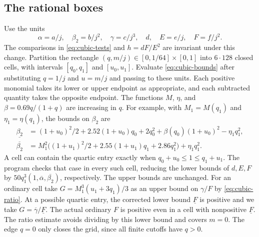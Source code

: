 \subsection{The rational boxes}

Use the units
\[
 \alpha=a/j,\quad \beta_2=b/j^2,\quad \gamma=c/j^3,\quad
 d,\quad E=e/j,\quad F=f/j^2 .
\]
The comparisons in \eqref{eq:cubic-tests} and \(h=dF/E^2\) are invariant
under this change. Partition the rectangle
\((q,m/j)\in[0,1/64]\times[0,1]\) into \(6\cdot128\) closed cells, with
intervals \([q_0,q_1]\) and \([u_0,u_1]\).
Evaluate \eqref{eq:cubic-bounds} after substituting \(q=1/j\) and
\(u=m/j\) and passing to these units. Each positive monomial takes its
lower or upper endpoint as appropriate, and each subtracted quantity
takes the opposite endpoint. The functions \(M\), \(\eta\), and
\(\beta=0.69q/(1+q)\) are increasing in \(q\).
For example, with \(M_1=M(q_1)\) and \(\eta_1=\eta(q_1)\), the bounds
on \(\beta_2\) are
\[
\begin{aligned}
\underline{\beta_2}
 &= (1+u_0)^2/2+2.52(1+u_0)q_0+2q_0^2
           +\beta(q_0)(1+u_0)^2-\eta_1q_1^2,\\
\overline{\beta_2}
 &= M_1^2\bigl((1+u_1)^2/2+2.55(1+u_1)q_1+2.86q_1^2\bigr)
           +\eta_1q_1^2 .
\end{aligned}
\]
A cell can contain the quartic entry exactly when
\(q_0+u_0\le1\le q_1+u_1\). The program checks that case in every such
cell, reducing the lower bounds of \(d,E,F\) by
\(50q_1^3(1,\overline{\alpha},\overline{\beta_2})\), respectively.
The upper bounds are unchanged. For an ordinary cell take
\(G=M_1^3(u_1+3q_1)/3\) as an upper bound on \(\gamma/F\) by
\eqref{eq:cubic-ratio}. At a possible quartic entry, the corrected lower
bound \(\underline F\) is positive and we take \(G=\overline\gamma/\underline F\).
The actual ordinary \(F\) is positive even in a cell with nonpositive
\(\underline F\). The ratio estimate avoids dividing by this lower
bound and covers \(m=0\). The edge \(q=0\) only closes the grid, since
all finite cutoffs have \(q>0\).

